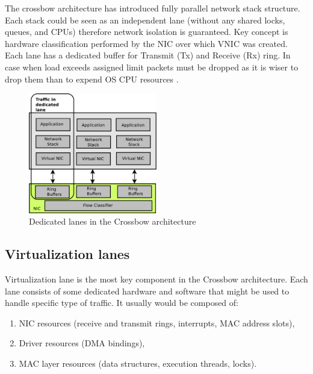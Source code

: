 \documentclass[11pt]{book}
\begin{document}
        The crossbow architecture has introduced fully parallel network stack structure. Each stack could be seen as
        an independent lane (without any shared locks, queues, and CPUs) therefore network isolation is guaranteed.
        Key concept is hardware classification performed by the NIC over which VNIC was created.  Each lane has a
        dedicated buffer for Transmit (Tx) and Receive (Rx) ring. In case when load exceeds assigned limit packets must
        be dropped as it is wiser to drop them than to expend OS CPU resources \cite{crossbow}.

        \begin{figure}[H]
          \begin{center}
            \includegraphics[width=0.5\textwidth]{img/crossbow-traffic-dedicated-line.pdf}
          \end{center}

          \caption{Dedicated lanes in the Crossbow architecture}
        \end{figure}

		
      \subsection{Virtualization lanes}

        Virtualization lane is the most key component in the Crossbow architecture. Each lane consists of some dedicated
        hardware and software that might be used to handle specific type of traffic. It usually would be composed of: 

        \begin{enumerate}
          \item NIC resources (receive and transmit rings, interrupts, MAC address slots),
          \item Driver resources (DMA bindings),
          \item MAC layer resources (data structures, execution threads, locks).
        \end{enumerate}
        
\end{document}
